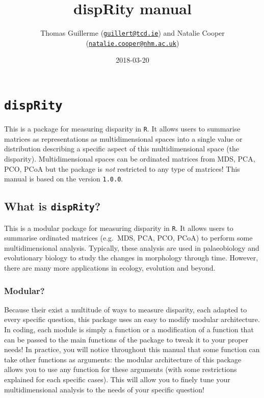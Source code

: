 \documentclass[]{book}
\title{dispRity manual}
\author{Thomas Guillerme
(\href{mailto:guillert@tcd.ie}{\nolinkurl{guillert@tcd.ie}}) and Natalie
Cooper
(\href{mailto:natalie.cooper@nhm.ac.uk}{\nolinkurl{natalie.cooper@nhm.ac.uk}})}
\date{2018-03-20}
\theoremstyle{definition}
\theoremstyle{definition}
\theoremstyle{remark}
\begin{document}
\maketitle

{
\setcounter{tocdepth}{1}
\tableofcontents
}
\chapter{\texorpdfstring{\texttt{dispRity}}{dispRity}}\label{disprity}

This is a package for measuring disparity in \texttt{R}. It allows users
to summarise matrices as representations as multidimensional spaces into
a single value or distribution describing a specific aspect of this
multidimensional space (the disparity). Multidimensional spaces can be
ordinated matrices from MDS, PCA, PCO, PCoA but the package is
\emph{not} restricted to any type of matrices! This manual is based on
the version \texttt{1.0.0}.

\section{\texorpdfstring{What is
\texttt{dispRity}?}{What is dispRity?}}\label{what-is-disprity}

This is a modular package for measuring disparity in \texttt{R}. It
allows users to summarise ordinated matrices (e.g.~MDS, PCA, PCO, PCoA)
to perform some multidimensional analysis. Typically, these analysis are
used in palaeobiology and evolutionary biology to study the changes in
morphology through time. However, there are many more applications in
ecology, evolution and beyond.

\subsection{Modular?}\label{modular}

Because their exist a multitude of ways to measure disparity, each
adapted to every specific question, this package uses an easy to modify
modular architecture. In coding, each module is simply a function or a
modification of a function that can be passed to the main functions of
the package to tweak it to your proper needs! In practice, you will
notice throughout this manual that some function can take other
functions as arguments: the modular architecture of this package allows
you to use any function for these arguments (with some restrictions
explained for each specific cases). This will allow you to finely tune
your multidimensional analysis to the needs of your specific question!
\end{document}
